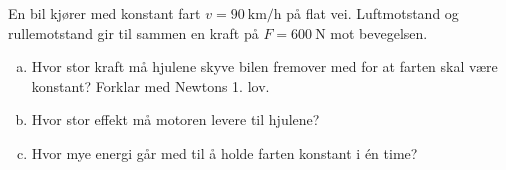 %
En bil kjører med konstant fart $v = \SI{90}{\kilo\metre\per\hour}$ på flat vei. Luftmotstand og rullemotstand gir til sammen en kraft på $F = \SI{600}{\newton}$ mot bevegelsen.
\begin{enumerate}[a)]
    \item Hvor stor kraft må hjulene skyve bilen fremover med for at farten skal være konstant? Forklar med Newtons 1. lov.
    \item Hvor stor effekt må motoren levere til hjulene?
    \item Hvor mye energi går med til å holde farten konstant i én time?
\end{enumerate}
